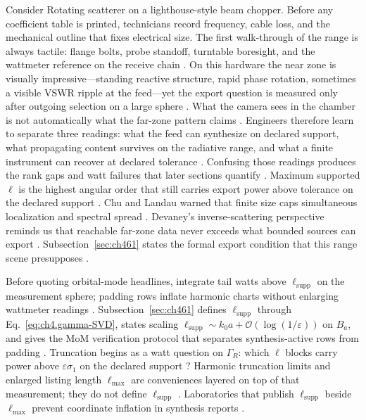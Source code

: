 \begin{physicalvignette}
Consider Rotating scatterer on a lighthouse-style beam chopper. Before any coefficient table is printed, technicians record frequency, cable loss, and the mechanical outline that fixes electrical size. The first walk-through of the range is always tactile: flange bolts, probe standoff, turntable boresight, and the wattmeter reference on the receive chain \cite{hansen1988}.
On this hardware the near zone is visually impressive---standing reactive structure, rapid phase rotation, sometimes a visible VSWR ripple at the feed---yet the export question is measured only after outgoing selection on a large sphere \cite{harrington2001}. What the camera sees in the chamber is not automatically what the far-zone pattern claims \cite{stratton1941}.
Engineers therefore learn to separate three readings: what the feed can synthesize on declared support, what propagating content survives on the radiative range, and what a finite instrument can recover at declared tolerance \cite{devaney2004}. Confusing those readings produces the rank gaps and watt failures that later sections quantify \cite{pal2026}.
Maximum supported $\ell$ is the highest angular order that still carries export power above tolerance on the declared support \cite{hansen1988}. 
Chu and Landau warned that finite size caps simultaneous localization and spectral spread \cite{chu1948}. Devaney's inverse-scattering perspective reminds us that reachable far-zone data never exceeds what bounded sources can export \cite{devaney2004}.
Subsection~\ref{sec:ch461} states the formal export condition that this range scene presupposes \cite{stratton1941}.
\end{physicalvignette}
Before quoting orbital-mode headlines, integrate tail watts above $\ell_{\mathrm{supp}}$ on the measurement sphere; padding rows inflate harmonic charts without enlarging wattmeter readings \cite{poynting1884}. Subsection~\ref{sec:ch461} defines $\ell_{\mathrm{supp}}$ through Eq.~\eqref{eq:ch4.gamma-SVD}, states scaling $\ell_{\mathrm{supp}}\sim k_0 a+\mathcal{O}(\log(1/\varepsilon))$ on $B_a$, and gives the MoM verification protocol that separates synthesis-active rows from padding \cite{hansen1988}.
Truncation begins as a watt question on $\Gamma_R$: which $\ell$ blocks carry power above $\varepsilon\sigma_{1}$ on the declared support \cite{hansen1988}? Harmonic truncation limits and enlarged listing length $\ell_{\max}$ are conveniences layered on top of that measurement; they do not define $\ell_{\mathrm{supp}}$ \cite{chu1948}. Laboratories that publish $\ell_{\mathrm{supp}}$ beside $\ell_{\max}$ prevent coordinate inflation in synthesis reports \cite{jackson1999}.

